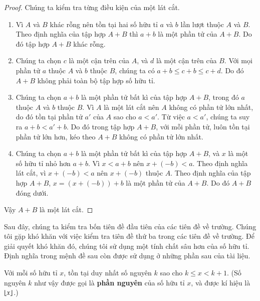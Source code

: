 \begin{proof}
    Chúng ta kiểm tra từng điều kiện của một lát cắt.
    \begin{enumerate}[label={(DC\arabic*)},itemindent=0.5cm]
        \item Vì $A$ và $B$ khác rỗng nên tồn tại hai số hữu tỉ $a$ và $b$ lần lượt thuộc $A$ và $B$. Theo định nghĩa của tập hợp $A + B$ thì $a + b$ là một phần tử của $A + B$. Do đó tập hợp $A + B$ khác rỗng.
        \item Chúng ta chọn $c$ là một cận trên của $A$, và $d$ là một cận trên của $B$. Với mọi phần tử $a$ thuộc $A$ và $b$ thuộc $B$, chúng ta có $a + b\leq c + b \leq c + d$. Do đó $A + B$ không phải toàn bộ tập hợp số hữu tỉ.
        \item Chúng ta chọn $a + b$ là một phần tử bất kì của tập hợp $A + B$, trong đó $a$ thuộc $A$ và $b$ thuộc $B$. Vì $A$ là một lát cắt nên $A$ không có phần tử lớn nhất, do đó tồn tại phần tử $a'$ của $A$ sao cho $a < a'$. Từ việc $a < a'$, chúng ta suy ra $a + b < a' + b$. Do đó trong tập hợp $A + B$, với mỗi phần tử, luôn tồn tại phần tử lớn hơn, kéo theo $A + B$ không có phần tử lớn nhất.
        \item Chúng ta chọn $a + b$ là một phần tử bất kì của tập hợp $A + B$, và $x$ là một số hữu tỉ nhỏ hơn $a + b$. Vì $x < a + b$ nên $x + (-b) < a$. Theo định nghĩa lát cắt, vì $x + (-b) < a$ nên $x + (-b)$ thuộc $A$. Theo định nghĩa của tập hợp $A + B$, $x = (x + (-b)) + b$ là một phần tử của $A + B$. Do đó $A + B$ đóng dưới.
    \end{enumerate}

    Vậy $A + B$ là một lát cắt.
\end{proof}

Sau đây, chúng ta kiểm tra bốn tiên đề đầu tiên của các tiên đề về trường. Chúng tôi gặp khó khăn với việc kiểm tra tiên đề thứ ba trong các tiên đề về trường. Để giải quyết khó khăn đó, chúng tôi sử dụng một tính chất sâu hơn của số hữu tỉ. Định nghĩa trong mệnh đề sau còn được sử dụng ở những phần sau của tài liệu.

\begin{proposition}\label{proposition:integral-part-of-rational-numbers}
    Với mỗi số hữu tỉ $x$, tồn tại duy nhất số nguyên $k$ sao cho $k\leq x < k+1$. (Số nguyên $k$ như vậy được gọi là \textbf{phần nguyên} của số hữu tỉ $x$, và được kí hiệu là $\left\lfloor{x}\right\rfloor$.)
\end{proposition}

